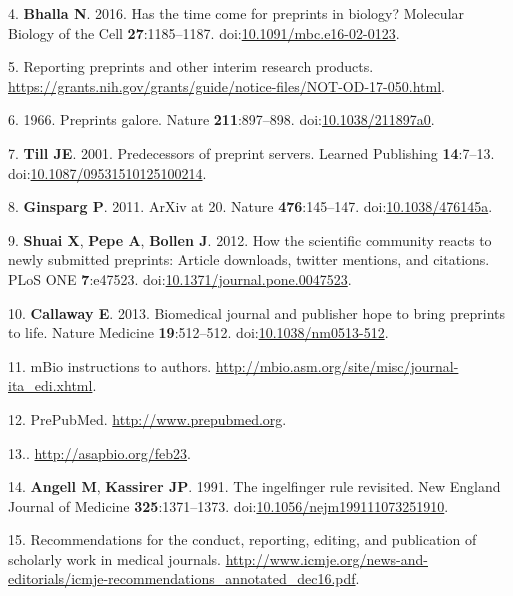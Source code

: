 \documentclass[11pt,]{article}
\begin{document}
\hypertarget{ref-Bhalla2016}{}
4. \textbf{Bhalla N}. 2016. Has the time come for preprints in biology?
Molecular Biology of the Cell \textbf{27}:1185--1187.
doi:\href{https://doi.org/10.1091/mbc.e16-02-0123}{10.1091/mbc.e16-02-0123}.

\hypertarget{ref-NIH_NOTICE}{}
5. Reporting preprints and other interim research products.
\url{https://grants.nih.gov/grants/guide/notice-files/NOT-OD-17-050.html}.

\hypertarget{ref-Nature1966}{}
6. 1966. Preprints galore. Nature \textbf{211}:897--898.
doi:\href{https://doi.org/10.1038/211897a0}{10.1038/211897a0}.

\hypertarget{ref-Till2001}{}
7. \textbf{Till JE}. 2001. Predecessors of preprint servers. Learned
Publishing \textbf{14}:7--13.
doi:\href{https://doi.org/10.1087/09531510125100214}{10.1087/09531510125100214}.

\hypertarget{ref-Ginsparg2011}{}
8. \textbf{Ginsparg P}. 2011. ArXiv at 20. Nature \textbf{476}:145--147.
doi:\href{https://doi.org/10.1038/476145a}{10.1038/476145a}.

\hypertarget{ref-Shuai2012}{}
9. \textbf{Shuai X}, \textbf{Pepe A}, \textbf{Bollen J}. 2012. How the
scientific community reacts to newly submitted preprints: Article
downloads, twitter mentions, and citations. PLoS ONE \textbf{7}:e47523.
doi:\href{https://doi.org/10.1371/journal.pone.0047523}{10.1371/journal.pone.0047523}.

\hypertarget{ref-Callaway2013}{}
10. \textbf{Callaway E}. 2013. Biomedical journal and publisher hope to
bring preprints to life. Nature Medicine \textbf{19}:512--512.
doi:\href{https://doi.org/10.1038/nm0513-512}{10.1038/nm0513-512}.

\hypertarget{ref-mBio_ITA}{}
11. mBio instructions to authors.
\url{http://mbio.asm.org/site/misc/journal-ita_edi.xhtml}.

\hypertarget{ref-PrePubMed}{}
12. PrePubMed. \url{http://www.prepubmed.org}.

\hypertarget{ref-ASAPbio}{}
13.. \url{http://asapbio.org/feb23}.

\hypertarget{ref-Angell1991}{}
14. \textbf{Angell M}, \textbf{Kassirer JP}. 1991. The ingelfinger rule
revisited. New England Journal of Medicine \textbf{325}:1371--1373.
doi:\href{https://doi.org/10.1056/nejm199111073251910}{10.1056/nejm199111073251910}.

\hypertarget{ref-ICMJE}{}
15. Recommendations for the conduct, reporting, editing, and publication
of scholarly work in medical journals.
\url{http://www.icmje.org/news-and-editorials/icmje-recommendations_annotated_dec16.pdf}.
\end{document}
